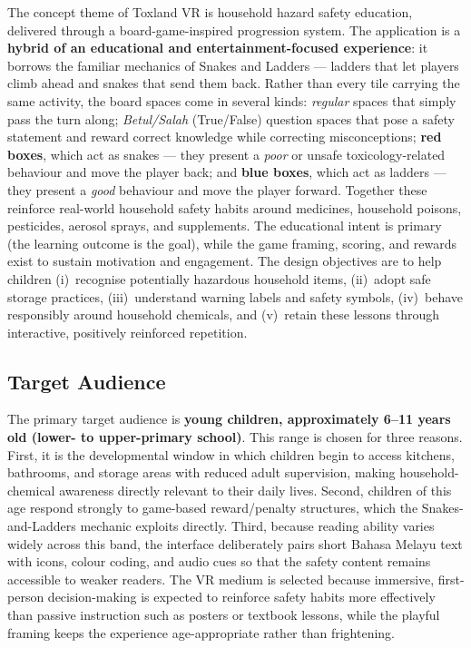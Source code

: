 \documentclass[a4paper,12pt]{article}
\begin{document}
The concept theme of Toxland VR is household hazard safety education, delivered through a board-game-inspired progression system. The application is a \textbf{hybrid of an educational and entertainment-focused experience}: it borrows the familiar mechanics of Snakes and Ladders --- ladders that let players climb ahead and snakes that send them back. Rather than every tile carrying the same activity, the board spaces come in several kinds: \emph{regular} spaces that simply pass the turn along; \emph{Betul/Salah} (True/False) question spaces that pose a safety statement and reward correct knowledge while correcting misconceptions; \textbf{red boxes}, which act as snakes --- they present a \emph{poor} or unsafe toxicology-related behaviour and move the player back; and \textbf{blue boxes}, which act as ladders --- they present a \emph{good} behaviour and move the player forward. Together these reinforce real-world household safety habits around medicines, household poisons, pesticides, aerosol sprays, and supplements. The educational intent is primary (the learning outcome is the goal), while the game framing, scoring, and rewards exist to sustain motivation and engagement. The design objectives are to help children (i)~recognise potentially hazardous household items, (ii)~adopt safe storage practices, (iii)~understand warning labels and safety symbols, (iv)~behave responsibly around household chemicals, and (v)~retain these lessons through interactive, positively reinforced repetition.

\subsection{Target Audience}

The primary target audience is \textbf{young children, approximately 6--11 years old (lower- to upper-primary school)}. This range is chosen for three reasons. First, it is the developmental window in which children begin to access kitchens, bathrooms, and storage areas with reduced adult supervision, making household-chemical awareness directly relevant to their daily lives. Second, children of this age respond strongly to game-based reward/penalty structures, which the Snakes-and-Ladders mechanic exploits directly. Third, because reading ability varies widely across this band, the interface deliberately pairs short Bahasa Melayu text with icons, colour coding, and audio cues so that the safety content remains accessible to weaker readers. The VR medium is selected because immersive, first-person decision-making is expected to reinforce safety habits more effectively than passive instruction such as posters or textbook lessons, while the playful framing keeps the experience age-appropriate rather than frightening.
\end{document}
